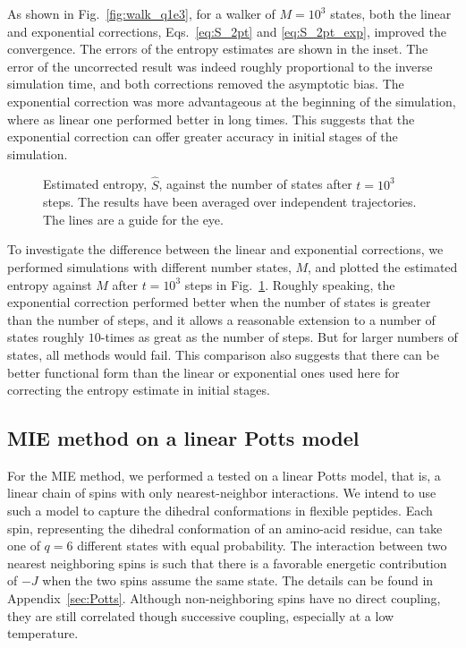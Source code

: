 \documentclass[reprint, superscriptaddress]{revtex4-1}
\begin{document}
As shown in Fig.~\ref{fig:walk_q1e3}, for a walker of $M = 10^3$ states,
both the linear and exponential corrections,
Eqs.~\eqref{eq:S_2pt} and \eqref{eq:S_2pt_exp},
improved the convergence.
%
The errors of the entropy estimates are shown in the inset.
%
The error of the uncorrected result
was indeed roughly proportional to the inverse simulation time,
and both corrections removed the asymptotic bias.
%
The exponential correction was more advantageous
at the beginning of the simulation,
where as linear one performed better in long times.
%
This suggests that the exponential correction
can offer greater accuracy in initial stages
of the simulation.


\begin{figure}[h]\centering
  \caption{
    \label{fig:walk_Svsq}
    Estimated entropy, $\hat S$,
    against the number of states
    after $t = 10^3$ steps.
    The results have been averaged over independent trajectories.
    The lines are a guide for the eye.
  }
\end{figure}

To investigate the difference between the linear and exponential corrections,
we performed simulations with different number states, $M$,
and plotted the estimated entropy against $M$
after $t = 10^3$ steps in Fig.~\ref{fig:walk_Svsq}.
%
Roughly speaking, the exponential correction performed better
when the number of states is greater than the number of steps,
and it allows a reasonable extension to
a number of states roughly $10$-times as great as the number of steps.
%
But for larger numbers of states, all methods would fail.
%
This comparison also suggests that there can be
better functional form than the linear or exponential ones used here
for correcting the entropy estimate in initial stages.



\subsection{MIE method on a linear Potts model}

For the MIE method, we performed a tested on a linear Potts model,
that is, a linear chain of spins with only nearest-neighbor interactions.
%
We intend to use such a model
to capture the dihedral conformations in flexible peptides.
%
Each spin, representing the dihedral conformation of an amino-acid residue,
can take one of $q = 6$ different states with equal probability.
%
The interaction between two nearest neighboring spins
is such that there is a favorable energetic contribution of $-J$
when the two spins assume the same state.
%
The details can be found in Appendix~\ref{sec:Potts}.
%
Although non-neighboring spins have no direct coupling,
they are still correlated though successive coupling,
especially at a low temperature.
\end{document}
